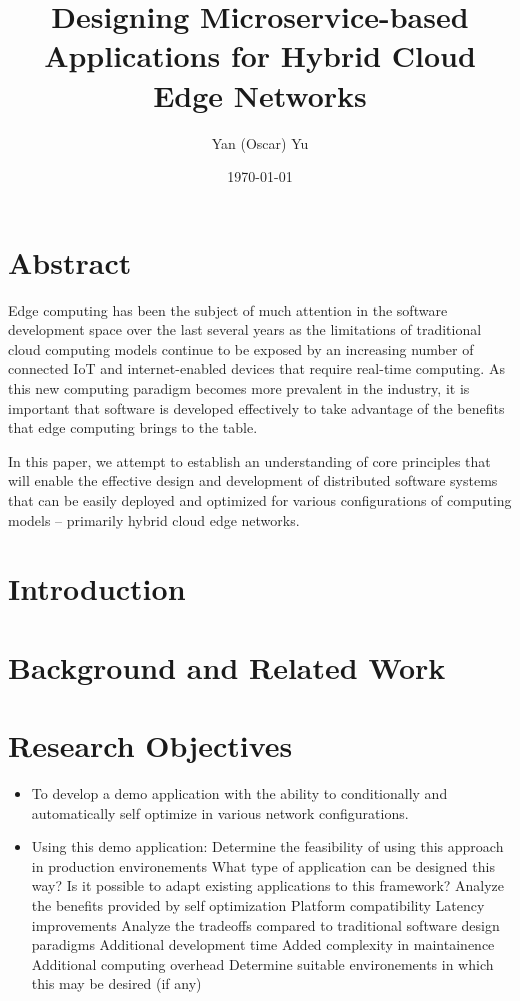 \documentclass[11pt]{article}
\title{Designing Microservice-based Applications for Hybrid Cloud Edge Networks}
\author{Yan (Oscar) Yu}
\date{\today}
\begin{document}


\section*{Abstract}

Edge computing has been the subject of much attention in the software
development space over the last several years as the limitations of traditional cloud computing 
models continue to be exposed by an increasing number of connected IoT and internet-enabled 
devices that require real-time computing. As this new computing paradigm becomes more prevalent 
in the industry, it is important that software is developed effectively to take advantage of the
benefits that edge computing brings to the table.
\newline

In this paper, we attempt to establish an understanding of core principles that will enable the 
effective design and development of distributed software systems that can be easily deployed and 
optimized for various configurations of computing models -- primarily hybrid cloud edge networks.
\newline

\newpage
\tableofcontents

\newpage
\section{Introduction}

\newpage
\section{Background and Related Work}

\newpage
\section{Research Objectives}
\begin{itemize}
    \item {
        To develop a demo application with the ability to conditionally and automatically self 
        optimize in various network configurations.
        }
    \item { 
        Using this demo application:
        \subitem Determine the feasibility of using this approach in production environements
            \subsubitem What type of application can be designed this way?
            \subsubitem Is it possible to adapt existing applications to this framework?
        \subitem Analyze the benefits provided by self optimization 
            \subsubitem Platform compatibility
            \subsubitem Latency improvements
        \subitem Analyze the tradeoffs compared to traditional software design paradigms
            \subsubitem Additional development time
            \subsubitem Added complexity in maintainence
            \subsubitem Additional computing overhead
        \subitem Determine suitable environements in which this may be desired (if any)
    }
\end{itemize}
\end{document}
